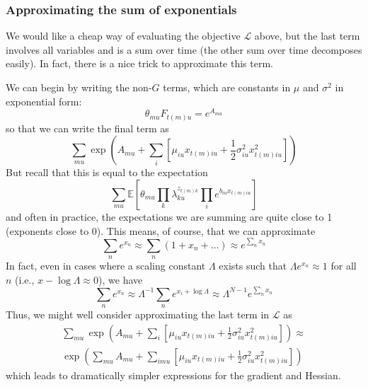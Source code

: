 \documentclass[11pt]{article}
\begin{document}
\subsubsection{Approximating the sum of exponentials}
We would like a cheap way of evaluating the objective $\mathcal{L}$ above, but the last term involves all variables and is a sum over time (the other sum over time decomposes easily). In fact, there is a nice trick to approximate this term.

We can begin by writing the non-$G$ terms, which are constants in $\mu$ and $\sigma^2$ in exponential form:
\begin{equation}
    \theta_{mu} F_{t(m)u} = e^{A_{mu}}
\end{equation}
so that we can write the final term as
\begin{equation}
    \sum_{mu} \exp\left(A_{mu} +  \sum_i \left[ \mu_{iu} x_{t(m)iu} +
    \frac{1}{2} \sigma^2_{iu} x^2_{t(m)iu}\right]\right)
\end{equation}
But recall that this is equal to the expectation
\begin{equation}
    \sum_{mu}\mathbb{E}\left[ \theta_{mu} \prod_k \lambda_{ku}^{z_{t(m)k}}
    \prod_i e^{b_{iu} x_{t(m)iu}}\right]
\end{equation}
and often in practice, the expectations we are summing are quite close to 1 (exponents close to 0). This means, of course, that we can approximate
\begin{equation}
    \sum_n e^{x_n} \approx \sum_n (1 + x_n + \ldots) \approx e^{\sum_n x_n}
\end{equation}
In fact, even in cases where a scaling constant $\Lambda$ exists such that $\Lambda e^{x_n} \approx 1$ for all $n$ (i.e., $x - \log \Lambda \approx 0$), we have
\begin{equation}
    \sum_n e^{x_n} \approx \Lambda^{-1} \sum_n e^{x_i + \log \Lambda} \approx
    \Lambda^{N - 1} e^{\sum_n x_n}
\end{equation}
Thus, we might well consider approximating the last term in $\mathcal{L}$ as
\begin{multline}
    \sum_{mu} \exp\left(A_{mu} +  \sum_i \left[ \mu_{iu} x_{t(m)iu} +
    \frac{1}{2} \sigma^2_{iu} x^2_{t(m)iu}\right]\right) \approx \\
    \exp\left(\sum_{mu} A_{mu} +  \sum_{imu} \left[ \mu_{iu} x_{t(m)iu} +
    \frac{1}{2} \sigma^2_{iu} x^2_{t(m)iu}\right]\right)
\end{multline}
which leads to dramatically simpler expressions for the gradient and Hessian.
\end{document}
